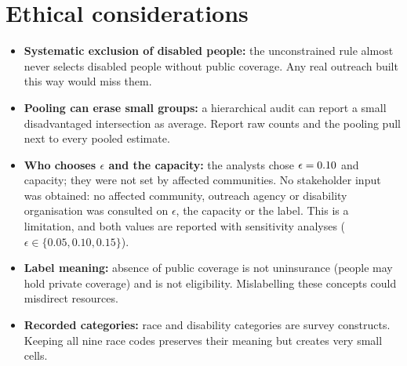 \documentclass[10pt]{article}
\begin{document}
\section{Ethical considerations}
\begin{itemize}
  \item \textbf{Systematic exclusion of disabled people:} the unconstrained rule almost never selects disabled people
    without public coverage. Any real outreach built this way would miss them.
  \item \textbf{Pooling can erase small groups:} a hierarchical audit can report a small disadvantaged intersection as
    average. Report raw counts and the pooling pull next to every pooled estimate.
  \item \textbf{Who chooses $\epsilon$ and the capacity:} the analysts chose $\epsilon=0.10{}$ and \capacity{}
    capacity; they were not set by affected communities. No stakeholder input was obtained: no affected community, outreach agency or disability organisation was consulted on $\epsilon$, the capacity or the label. This is a limitation, and both values are reported with sensitivity analyses ($\epsilon\in\{0.05,0.10,0.15\}$).
  \item \textbf{Label meaning:} absence of public coverage is not uninsurance (people may hold private coverage) and is not
    eligibility. Mislabelling these concepts could misdirect resources.
  \item \textbf{Recorded categories:} race and disability categories are survey constructs. Keeping all nine race codes
    preserves their meaning but creates very small cells.
\end{itemize}
\end{document}
